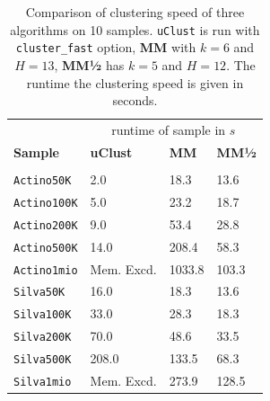 \documentclass[../../main.tex]{subfiles}
\begin{document}
\begin{table}[H]
\centering
\begin{tabular}{l l l l}
\hline
 & \multicolumn{3}{c}{runtime of sample in $s$}\\
\textbf{Sample} & \textbf{uClust} & \textbf{MM} & \textbf{MM½} \\
\hline \\
\texttt{Actino50K} & 2.0 & 18.3 & 13.6 \\
\texttt{Actino100K} & 5.0 & 23.2 & 18.7 \\
\texttt{Actino200K} & 9.0 & 53.4 & 28.8 \\
\texttt{Actino500K} & 14.0 & 208.4 & 58.3 \\
\texttt{Actino1mio} & Mem. Excd. & 1033.8 & 103.3 \\
\texttt{Silva50K} & 16.0 & 18.3 & 13.6\\
\texttt{Silva100K} & 33.0 & 28.3 & 18.3\\
\texttt{Silva200K} & 70.0 & 48.6 & 33.5\\
\texttt{Silva500K} & 208.0 & 133.5 & 68.3\\
\texttt{Silva1mio} & Mem. Excd. & 273.9 & 128.5\\
\hline
\end{tabular}
\caption{Comparison of clustering speed of three algorithms on 10 samples. \texttt{uClust} is run with \texttt{cluster\_fast} option, {\bf MM} with $k=6$ and $H=13$, {\bf MM½} has $k=5$ and $H=12$. The runtime the clustering speed is given in seconds.}\label{tab:speedtest}
\end{table}
\end{document}
